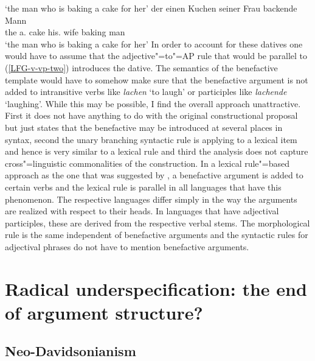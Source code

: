 \glt `the man who is baking a cake for her'
\ex
\gll der einen Kuchen seiner Frau backende Mann\\
     the a.\acc{} cake  his.\dat{} wife baking man\\
\glt `the man who is baking a cake for her'
\zl
In order to account for these datives one would have to assume that the adjective"=to"=AP rule that
would be parallel to (\ref{LFG-v-vp-two}) introduces the dative. The semantics of the benefactive
template would have to somehow make sure that the benefactive argument is not added to intransitive
verbs like \emph{lachen} `to laugh' or participles like \emph{lachende} `laughing'. While this may
be possible, I find the overall approach unattractive. First it does not have anything to do with
the original constructional proposal but just states that the benefactive may be introduced at
several places in syntax, second the unary branching syntactic rule is applying to a lexical
item and hence is very similar to a lexical rule and third the analysis does not capture cross"=linguistic commonalities of the
construction. In a lexical rule"=based approach as the one that was suggested by \citet[Section~5]{BC99a}, a benefactive argument is added to certain verbs
and the lexical rule is parallel in all languages that have this phenomenon. The respective
languages differ simply in the way the arguments are realized with respect to their heads. In languages
that have adjectival participles, these are derived from the respective verbal stems. The
morphological rule is the same independent of benefactive arguments and the syntactic rules for
adjectival phrases do not have to mention benefactive arguments.



\section{Radical underspecification: the end of argument structure?}
\label{radical-sec}

\subsection{Neo-Davidsonianism}

